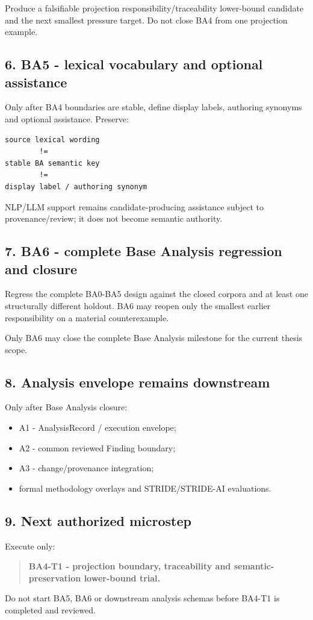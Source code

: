 \documentclass[11pt,a4paper]{article}
\providecommand{\tightlist}{\setlength{\itemsep}{0pt}\setlength{\parskip}{0pt}}
\begin{document}
Produce a falsifiable projection responsibility/traceability lower-bound candidate and the next smallest pressure target. Do not close BA4 from one projection example.

\subsection{6. BA5 - lexical vocabulary and optional assistance}\label{ba5---lexical-vocabulary-and-optional-assistance}

Only after BA4 boundaries are stable, define display labels, authoring synonyms and optional assistance. Preserve:

\begin{verbatim}
source lexical wording
        !=
stable BA semantic key
        !=
display label / authoring synonym
\end{verbatim}

NLP/LLM support remains candidate-producing assistance subject to provenance/review; it does not become semantic authority.

\subsection{7. BA6 - complete Base Analysis regression and closure}\label{ba6---complete-base-analysis-regression-and-closure}

Regress the complete BA0-BA5 design against the closed corpora and at least one structurally different holdout. BA6 may reopen only the smallest earlier responsibility on a material counterexample.

Only BA6 may close the complete Base Analysis milestone for the current thesis scope.

\subsection{8. Analysis envelope remains downstream}\label{analysis-envelope-remains-downstream}

Only after Base Analysis closure:

\begin{itemize}
\tightlist
\item
  A1 - AnalysisRecord / execution envelope;
\item
  A2 - common reviewed Finding boundary;
\item
  A3 - change/provenance integration;
\item
  formal methodology overlays and STRIDE/STRIDE-AI evaluations.
\end{itemize}

\subsection{9. Next authorized microstep}\label{next-authorized-microstep}

Execute only:

\begin{quote}
\textbf{BA4-T1 - projection boundary, traceability and semantic-preservation lower-bound trial.}
\end{quote}

Do not start BA5, BA6 or downstream analysis schemas before BA4-T1 is completed and reviewed.
\end{document}

